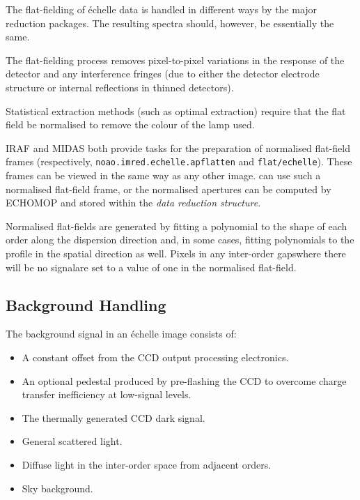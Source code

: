 The flat-fielding of \'{e}chelle data is handled in different ways by
the major reduction packages.  The resulting spectra should, however, be
essentially the same.

The flat-fielding process removes pixel-to-pixel variations in the
response of the detector and any interference fringes (due to either the
detector electrode structure or internal reflections in thinned
detectors).

Statistical extraction methods (such as optimal extraction) require
that the flat field be normalised to remove the colour of the lamp used.

IRAF and MIDAS both provide tasks for the preparation of normalised
flat-field frames (respectively, {\tt noao.imred.echelle.apflatten} and
{\tt{flat/echelle}})\@.  These frames can be viewed in the same
way as any other image.   can use such a
normalised flat-field frame, or the normalised apertures can be computed
by ECHOMOP and stored within the {\sl data reduction structure}\@.

Normalised flat-fields are generated by fitting a polynomial to the
shape of each order along the dispersion direction and, in some cases,
fitting polynomials to the profile in the spatial direction as well.
Pixels in any inter-order gaps\sgspec{---}{ - }where there will be no
signal\sgspec{---}{ - }are set
to a value of one in the normalised flat-field.


\subsection{\label{se_background_handling}Background
            Handling}

The background signal in an \'{e}chelle image consists of:

\begin{itemize}

\item A constant offset from the CCD output processing electronics.

\item An optional pedestal produced by pre-flashing the CCD to overcome
      charge transfer inefficiency at low-signal levels.

\item The thermally generated CCD dark signal.

\item General scattered light.

\item Diffuse light in the inter-order space from adjacent orders.

\item Sky background.

\end{itemize}

